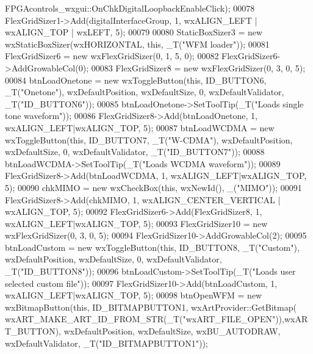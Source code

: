 \begin{DoxyCode}
      FPGAcontrols_wxgui::OnChkDigitalLoopbackEnableClick);
00078     FlexGridSizer1->Add(digitalInterfaceGroup, 1, wxALIGN\_LEFT | wxALIGN\_TOP | wxLEFT, 5);
00079 
00080     StaticBoxSizer3 = \textcolor{keyword}{new} wxStaticBoxSizer(wxHORIZONTAL, \textcolor{keyword}{this}, \_T(\textcolor{stringliteral}{"WFM loader"}));
00081     FlexGridSizer6 = \textcolor{keyword}{new} wxFlexGridSizer(0, 1, 5, 0);
00082     FlexGridSizer6->AddGrowableCol(0);
00083     FlexGridSizer8 = \textcolor{keyword}{new} wxFlexGridSizer(0, 3, 0, 5);
00084     btnLoadOnetone = \textcolor{keyword}{new} wxToggleButton(\textcolor{keyword}{this}, ID\_BUTTON6, \_T(\textcolor{stringliteral}{"Onetone"}), wxDefaultPosition, wxDefaultSize, 
      0, wxDefaultValidator, \_T(\textcolor{stringliteral}{"ID\_BUTTON6"}));
00085     btnLoadOnetone->SetToolTip(\_T(\textcolor{stringliteral}{"Loads single tone waveform"}));
00086     FlexGridSizer8->Add(btnLoadOnetone, 1, wxALIGN\_LEFT|wxALIGN\_TOP, 5);
00087     btnLoadWCDMA = \textcolor{keyword}{new} wxToggleButton(\textcolor{keyword}{this}, ID\_BUTTON7, \_T(\textcolor{stringliteral}{"W-CDMA"}), wxDefaultPosition, wxDefaultSize, 0, 
      wxDefaultValidator, \_T(\textcolor{stringliteral}{"ID\_BUTTON7"}));
00088     btnLoadWCDMA->SetToolTip(\_T(\textcolor{stringliteral}{"Loads WCDMA waveform"}));
00089     FlexGridSizer8->Add(btnLoadWCDMA, 1, wxALIGN\_LEFT|wxALIGN\_TOP, 5);
00090     chkMIMO = \textcolor{keyword}{new} wxCheckBox(\textcolor{keyword}{this}, wxNewId(), \_(\textcolor{stringliteral}{"MIMO"}));
00091     FlexGridSizer8->Add(chkMIMO, 1, wxALIGN\_CENTER\_VERTICAL | wxALIGN\_TOP, 5);
00092     FlexGridSizer6->Add(FlexGridSizer8, 1, wxALIGN\_LEFT|wxALIGN\_TOP, 5);
00093     FlexGridSizer10 = \textcolor{keyword}{new} wxFlexGridSizer(0, 3, 0, 5);
00094     FlexGridSizer10->AddGrowableCol(2);
00095     btnLoadCustom = \textcolor{keyword}{new} wxToggleButton(\textcolor{keyword}{this}, ID\_BUTTON8, \_T(\textcolor{stringliteral}{"Custom"}), wxDefaultPosition, wxDefaultSize, 0,
       wxDefaultValidator, \_T(\textcolor{stringliteral}{"ID\_BUTTON8"}));
00096     btnLoadCustom->SetToolTip(\_T(\textcolor{stringliteral}{"Loads user selected custom file"}));
00097     FlexGridSizer10->Add(btnLoadCustom, 1, wxALIGN\_LEFT|wxALIGN\_TOP, 5);
00098     btnOpenWFM = \textcolor{keyword}{new} wxBitmapButton(\textcolor{keyword}{this}, ID\_BITMAPBUTTON1, wxArtProvider::GetBitmap(
      wxART\_MAKE\_ART\_ID\_FROM\_STR(\_T(\textcolor{stringliteral}{"wxART\_FILE\_OPEN"})),wxART\_BUTTON), wxDefaultPosition, wxDefaultSize, wxBU\_AUTODRAW, 
      wxDefaultValidator, \_T(\textcolor{stringliteral}{"ID\_BITMAPBUTTON1"}));

\end{DoxyCode}
